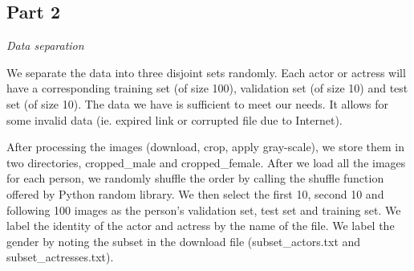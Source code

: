 \documentclass{article}
\begin{document}
\newpage
\begin{part2}

\maketitle

\newpage
\section{Part 2}
\noindent \textit{Data separation}

\vspace{5mm}

We separate the data into three disjoint sets randomly. Each actor or actress will have a corresponding training set (of size 100), validation set (of size 10) and test set (of size 10). The data we have is sufficient to meet our needs. It allows for some invalid data (ie. expired link or corrupted file due to Internet).

\vspace{5mm}

After processing the images (download, crop, apply gray-scale), we store them in two directories, cropped\_male and cropped\_female. After we load all the images for each person, we randomly shuffle the order by calling the shuffle function offered by Python random library. We then select the first 10, second 10 and following 100 images as the person's validation set, test set and training set. We label the identity of the actor and actress by the name of the file. We label the gender by noting the subset in the download file (subset\_actors.txt and subset\_actresses.txt).



\end{part2}
\end{document}
